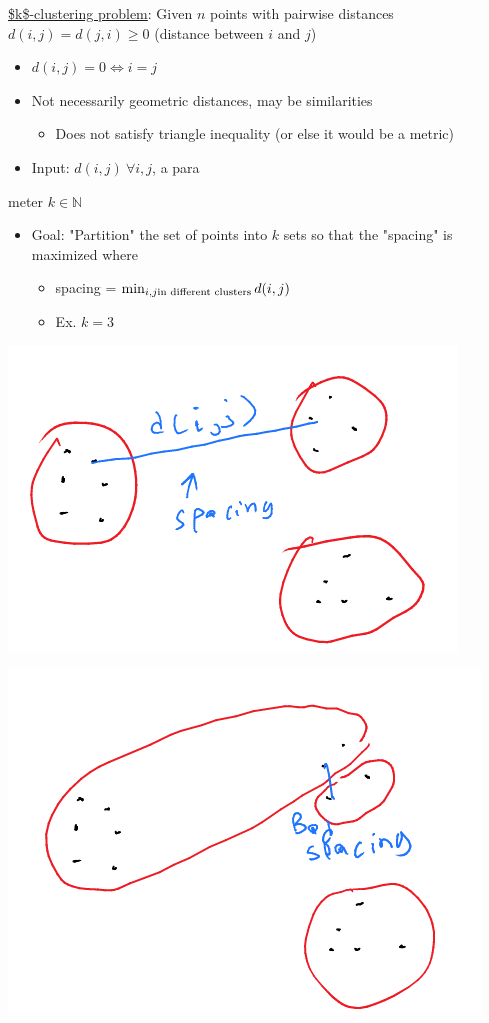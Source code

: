 \documentclass[11pt]{article}
\begin{document}
\uline{\$k\$-clustering problem}: Given \(n\) points with pairwise distances \(d(i,j)=d(j,i)\geq 0\) (distance between \(i\) and \(j\))
\begin{itemize}
\item \(d(i,j) = 0 \iff i=j\)
\item Not necessarily geometric distances, may be similarities
\begin{itemize}
\item Does not satisfy triangle inequality (or else it would be a metric)
\end{itemize}
\item Input: \(d(i,j) \ \forall i,j\), a para
\end{itemize}
meter \(k \in \mathbb{N}\)
\begin{itemize}
\item Goal: "Partition" the set of points into \(k\) sets so that the "spacing" is maximized where
\begin{itemize}
\item spacing = \(\min_{i,j \\ \text{in different clusters}} d(i,j)\)
\item Ex. \(k=3\)
\end{itemize}
\end{itemize}
\begin{center}
\includegraphics[width=.9\linewidth]{./Images/i55.png}
\end{center}
\begin{center}
\includegraphics[width=.9\linewidth]{./Images/i56.png}
\end{center}
\end{document}
